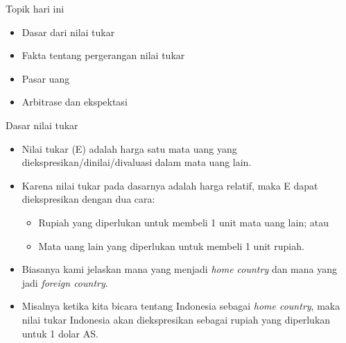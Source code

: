 \documentclass[
  ignorenonframetext,
]{beamer}
\begin{document}
\begin{frame}{Topik hari ini}
\label{topik-hari-ini}
\begin{itemize}
\item
  Dasar dari nilai tukar
\item
  Fakta tentang pergerangan nilai tukar
\item
  Pasar uang
\item
  Arbitrase dan ekspektasi
\end{itemize}
\end{frame}

\begin{frame}{Dasar nilai tukar}
\label{dasar-nilai-tukar}
\begin{itemize}
\item
  Nilai tukar (E) adalah harga satu mata uang yang
  diekspresikan/dinilai/divaluasi dalam mata uang lain.
\item
  Karena nilai tukar pada dasarnya adalah harga relatif, maka E dapat
  diekspresikan dengan dua cara:

  \begin{itemize}
  \item
    Rupiah yang diperlukan untuk membeli 1 unit mata uang lain; atau
  \item
    Mata uang lain yang diperlukan untuk membeli 1 unit rupiah.
  \end{itemize}
\item
  Biasanya kami jelaskan mana yang menjadi \emph{home country} dan mana
  yang jadi \emph{foreign country}.
\item
  Misalnya ketika kita bicara tentang Indonesia sebagai \emph{home
  country}, maka nilai tukar Indonesia akan diekspresikan sebagai rupiah
  yang diperlukan untuk 1 dolar AS.
\end{itemize}
\end{frame}
\end{document}
